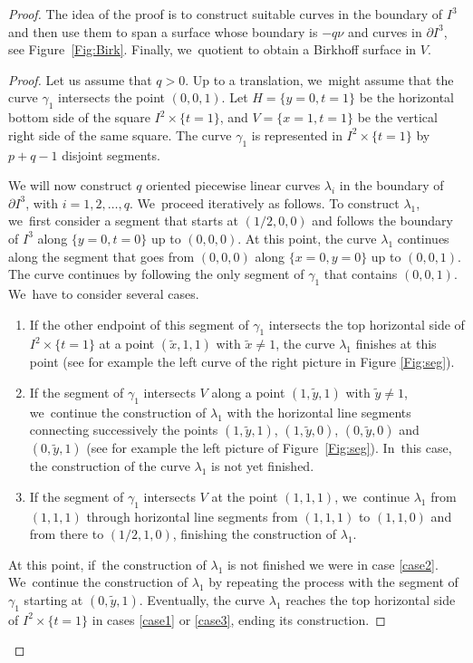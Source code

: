 \documentclass[JEP,XML,SOM,Unicode,NoEqCountersInSection,NoFloatCountersInSection,published]{cedram}
\theoremstyle{definition}
\begin{document}
\begin{proof}
The idea of the proof is to construct suitable curves in the boundary of $I^3$ and then use them to span a surface whose boundary is $-q\nu$ and curves in $\partial I^3$, see Figure~\ref{Fig:Birk}. Finally, we~quotient to obtain a Birkhoff surface in $V$.

\begin{proof}
Let us assume that $q>0$. Up to a translation, we~might assume that the curve $\gamma_1$ intersects the point $(0,0,1)$. Let $H=\{y=0, t=1\}$ be the horizontal bottom side of the square $I^2\times \{t=1\}$, and $V=\{x=1, t=1\}$ be the vertical right side of the same square. The curve $\gamma_1$ is represented in $I^2\times \{t=1\}$ by $p+q-1$ disjoint segments.

We will now construct $q$ oriented piecewise linear curves $\lambda_i$ in the boundary of $\partial I^3$, with $i=1,2,\ldots,q$. We~proceed iteratively as follows. To construct $\lambda_1$, we~first consider a segment that starts at $(1/2,0,0)$ and follows the boundary of $I^3$ along $\{y=0,t=0\}$ up to $(0,0,0)$. At this point, the curve $\lambda_1$ continues along the segment that goes from $(0,0,0)$ along $\{x=0, y=0\}$ up to $(0,0,1)$. The curve continues by following the only segment of $\gamma_1$ that contains $(0,0,1)$. We~have to consider several cases.
\begin{enumerate}
\item\label{case1} If the other endpoint of this segment of $\gamma_1$ intersects the top horizontal side of $I^2\times\{t=1\}$ at a point $(\widetilde x,1 ,1)$ with $\widetilde x\neq 1$, the curve $\lambda_1$ finishes at this point (see for example the left curve of the right picture in Figure \ref{Fig:seg}).
\item\label{case2} If the segment of $\gamma_1$ intersects $V$ along a point $(1, \widetilde y, 1)$ with $\widetilde y\neq 1$, we~continue the construction of $\lambda_1$ with the horizontal line segments connecting successively the points $(1,\widetilde y, 1)$, $(1,\widetilde y, 0)$, $(0,\widetilde y,0)$ and $(0,\widetilde y, 1)$ (see for example the left picture of Figure~\ref{Fig:seg}). In~this case, the construction of the curve $\lambda_1$ is not yet finished.
\item\label{case3} If the segment of $\gamma_1$ intersects $V$ at the point $(1, 1, 1)$, we~continue $\lambda_1$ from $(1,1,1)$ through horizontal line segments from $(1,1,1)$ to $(1,1,0)$ and from there to $(1/2,1,0)$, finishing the construction of $\lambda_1$.
\end{enumerate}
At this point, if~the construction of $\lambda_1$ is not finished we were in case \eqref{case2}. We~continue the construction of $\lambda_1$ by repeating the process with the segment of $\gamma_1$ starting at $(0,\widetilde y,1)$. Eventually, the curve $\lambda_1$ reaches the top horizontal side of $I^2\times\{t=1\}$ in cases \eqref{case1} or \eqref{case3}, ending its construction.


\end{proof}
\end{proof}
\end{document}

